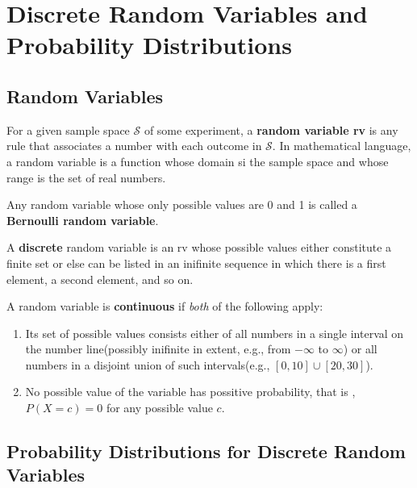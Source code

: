 \chapter{Discrete Random Variables and Probability Distributions}

\section{Random Variables}

\begin{definition}
    For a given sample space $\mathcal{S}$ of some experiment, a \textbf{random variable rv} is any rule that associates a number with each outcome in $\mathcal{S}$. In mathematical language, a random variable is a function whose domain si the sample space and whose range is the set of real numbers.
\end{definition}

\begin{definition}
    Any random variable whose only possible values are 0 and 1 is called a \textbf{Bernoulli random variable}.
\end{definition}

\begin{definition}
    A \textbf{discrete} random variable is an rv whose possible values either constitute a finite set or else can be listed in an inifinite sequence in which there is a first element, a second element, and so on.

    A random variable is \textbf{continuous} if \textit{both} of the following apply:


    \begin{enumerate}
        \item Its set of possible values consists either of all numbers in a single interval on the number line(possibly inifinite in extent, e.g., from $-\infty$ to $\infty$) or all numbers in a disjoint union of such intervals(e.g., $[0, 10]\cup[20, 30]$).
        \item No possible value of the variable has possitive probability, that is , $P(X=c) = 0$ for any possible value $c$.
    \end{enumerate}
\end{definition}

\section{Probability Distributions for Discrete Random Variables}

